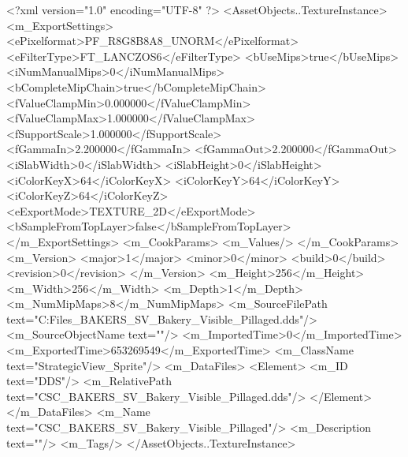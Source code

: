 <?xml version="1.0" encoding="UTF-8" ?>
<AssetObjects..TextureInstance>
	<m_ExportSettings>
		<ePixelformat>PF_R8G8B8A8_UNORM</ePixelformat>
		<eFilterType>FT_LANCZOS6</eFilterType>
		<bUseMips>true</bUseMips>
		<iNumManualMips>0</iNumManualMips>
		<bCompleteMipChain>true</bCompleteMipChain>
		<fValueClampMin>0.000000</fValueClampMin>
		<fValueClampMax>1.000000</fValueClampMax>
		<fSupportScale>1.000000</fSupportScale>
		<fGammaIn>2.200000</fGammaIn>
		<fGammaOut>2.200000</fGammaOut>
		<iSlabWidth>0</iSlabWidth>
		<iSlabHeight>0</iSlabHeight>
		<iColorKeyX>64</iColorKeyX>
		<iColorKeyY>64</iColorKeyY>
		<iColorKeyZ>64</iColorKeyZ>
		<eExportMode>TEXTURE_2D</eExportMode>
		<bSampleFromTopLayer>false</bSampleFromTopLayer>
	</m_ExportSettings>
	<m_CookParams>
		<m_Values/>
	</m_CookParams>
	<m_Version>
		<major>1</major>
		<minor>0</minor>
		<build>0</build>
		<revision>0</revision>
	</m_Version>
	<m_Height>256</m_Height>
	<m_Width>256</m_Width>
	<m_Depth>1</m_Depth>
	<m_NumMipMaps>8</m_NumMipMaps>
	<m_SourceFilePath text="C:\Users\Shadow\Desktop\Working Files\Icons\StrategicView\CSC_BAKERS_SV_Bakery_Visible_Pillaged.dds"/>
	<m_SourceObjectName text=""/>
	<m_ImportedTime>0</m_ImportedTime>
	<m_ExportedTime>653269549</m_ExportedTime>
	<m_ClassName text="StrategicView_Sprite"/>
	<m_DataFiles>
		<Element>
			<m_ID text="DDS"/>
			<m_RelativePath text="CSC_BAKERS_SV_Bakery_Visible_Pillaged.dds"/>
		</Element>
	</m_DataFiles>
	<m_Name text="CSC_BAKERS_SV_Bakery_Visible_Pillaged"/>
	<m_Description text=""/>
	<m_Tags/>
</AssetObjects..TextureInstance>

